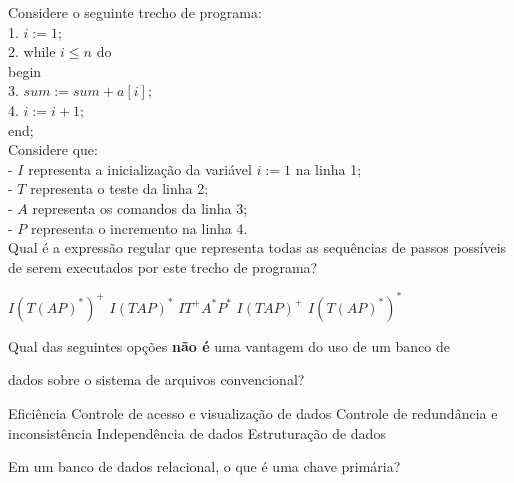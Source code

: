 \documentclass[12pt, addpoints]{exam}
\begin{document}
\begin{questions}
\question

Considere o seguinte trecho de programa:\\

1. \( i := 1; \)\\

2. while \( i \leq n \) do\\

   begin\\

3. \( sum := sum + a[i]; \)\\

4. \( i := i + 1; \)\\

   end;\\



Considere que:\\

- \( I \) representa a inicialização da variável \( i := 1 \) na linha 1;\\

- \( T \) representa o teste da linha 2;\\

- \( A \) representa os comandos da linha 3;\\

- \( P \) representa o incremento na linha 4.\\



Qual é a expressão regular que representa todas as sequências de passos possíveis de serem executados por este trecho de programa?
\begin{choices}
\choice \( I(T(AP)^*)^+ \)
\choice \( I(TAP)^* \)
\choice \( IT^+A^*P^* \)
\choice \( I(TAP)^+ \)
\choice \( I(T(AP)^*)^* \)
\end{choices}

\question

Qual das seguintes opções \textbf{não é} uma vantagem do uso de um banco de

dados sobre o sistema de arquivos convencional?


\begin{choices}
\choice Eficiência
\choice Controle de acesso e visualização de dados
\choice Controle de redundância e inconsistência
\choice Independência de dados
\choice Estruturação de dados
\end{choices}

\question

Em um banco de dados relacional, o que é uma chave primária?



\end{questions}
\end{document}
